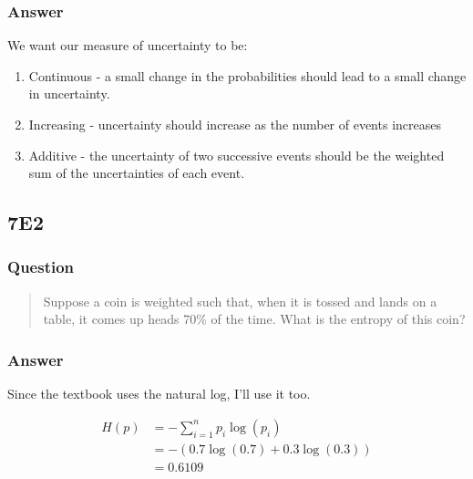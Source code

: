 \documentclass[
]{book}
\providecommand{\tightlist}{%
  \setlength{\itemsep}{0pt}\setlength{\parskip}{0pt}}
\begin{document}
\hypertarget{answer-60}{%
\subsubsection*{Answer}\label{answer-60}}

We want our measure of uncertainty to be:

\begin{enumerate}
\def\labelenumi{\arabic{enumi}.}
\tightlist
\item
  Continuous - a small change in the probabilities should lead to a small change in uncertainty.
\item
  Increasing - uncertainty should increase as the number of events increases
\item
  Additive - the uncertainty of two successive events should be the weighted sum of the uncertainties of each event.
\end{enumerate}

\hypertarget{e2-4}{%
\subsection*{7E2}\label{e2-4}}

\hypertarget{question-61}{%
\subsubsection*{Question}\label{question-61}}

\begin{quote}
Suppose a coin is weighted such that, when it is tossed and lands on a table, it comes up heads 70\% of the time. What is the entropy of this coin?
\end{quote}

\hypertarget{answer-61}{%
\subsubsection*{Answer}\label{answer-61}}

Since the textbook uses the natural log, I'll use it too.

\[\begin{aligned}
H(p) &= -\sum^n_{i=1}p_i \log(p_i) \\
&= -(0.7 \log(0.7) + 0.3 \log(0.3))\\
&= 0.6109
\end{aligned}\]
\end{document}
